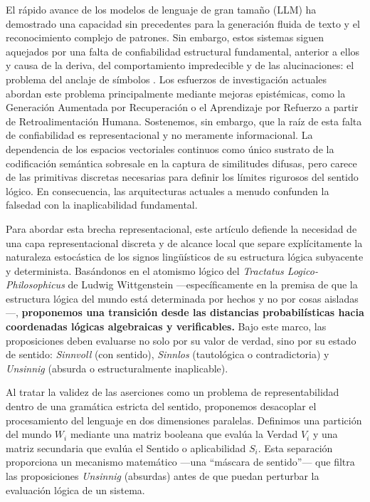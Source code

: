 \documentclass{article}
\begin{document}
El rápido avance de los modelos de lenguaje de gran tamaño (LLM) ha
demostrado una capacidad sin precedentes para la generación fluida de
texto y el reconocimiento complejo de patrones. Sin embargo, estos
sistemas siguen aquejados por una falta de confiabilidad estructural
fundamental, anterior a ellos y causa de la deriva, del comportamiento
impredecible y de las alucinaciones: el problema del anclaje de símbolos
\citep{harnad1990symbolgrounding}. Los esfuerzos de investigación
actuales abordan este problema principalmente mediante mejoras
epistémicas, como la Generación Aumentada por Recuperación o el
Aprendizaje por Refuerzo a partir de Retroalimentación Humana.
Sostenemos, sin embargo, que la raíz de esta falta de confiabilidad es
representacional y no meramente informacional. La dependencia de los
espacios vectoriales continuos como único sustrato de la codificación
semántica sobresale en la captura de similitudes difusas, pero carece de
las primitivas discretas necesarias para definir los límites rigurosos
del sentido lógico. En consecuencia, las arquitecturas actuales a menudo
confunden la falsedad con la inaplicabilidad fundamental.

Para abordar esta brecha representacional, este artículo defiende la
necesidad de una capa representacional discreta y de alcance local que
separe explícitamente la naturaleza estocástica de los signos
lingüísticos de su estructura lógica subyacente y determinista.
Basándonos en el atomismo lógico del \emph{Tractatus
Logico-Philosophicus} de Ludwig Wittgenstein ---específicamente en la
premisa de que la estructura lógica del mundo está determinada por
hechos y no por cosas aisladas---, \textbf{proponemos una transición
desde las distancias probabilísticas hacia coordenadas lógicas
algebraicas y verificables.} Bajo este marco, las proposiciones deben
evaluarse no solo por su valor de verdad, sino por su estado de sentido:
\emph{Sinnvoll} (con sentido), \emph{Sinnlos} (tautológica o
contradictoria) y \emph{Unsinnig} (absurda o estructuralmente
inaplicable).

Al tratar la validez de las aserciones como un problema de
representabilidad dentro de una gramática estricta del sentido,
proponemos desacoplar el procesamiento del lenguaje en dos dimensiones
paralelas. Definimos una partición del mundo \(W_i\) mediante una matriz
booleana que evalúa la Verdad \(V_i\) y una matriz secundaria que evalúa
el Sentido o aplicabilidad \(S_i\). Esta separación proporciona un
mecanismo matemático ---una ``máscara de sentido''--- que filtra las
proposiciones \emph{Unsinnig} (absurdas) antes de que puedan perturbar
la evaluación lógica de un sistema.
\end{document}
